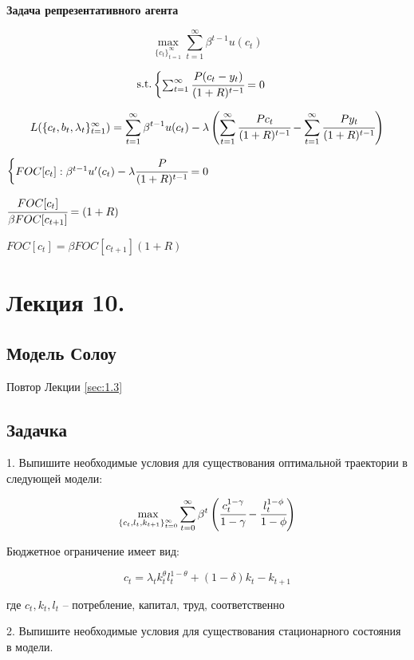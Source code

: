 \documentclass[reqno]{article}
\theoremstyle{definition}
\theoremstyle{definition}
\theoremstyle{definition}
\theoremstyle{definition}
\theoremstyle{definition}
\theoremstyle{definition}
\theoremstyle{definition}
\theoremstyle{definition}
\theoremstyle{definition}
\begin{document}
			 \textbf{Задача репрезентативного агента} 
			
			$$\max\limits_{\{c_t\}_{t=1}^\infty} \sum\limits_{t=1}^\infty \beta^{t-1} u(c_t)$$
			
			$$
			\text{s.t.}
			\begin{cases}
				\sum_{t=1}^\infty \cfrac{P (c_t - y_t)}{(1+R)^{t-1}} = 0
			\end{cases}
			$$
			
			$$L(\{c_t, b_t, \lambda_t\}_{t=1}^\infty) = \sum\limits_{t=1}^\infty \beta^{t-1} u(c_t) - \lambda \left(\sum_{t=1}^\infty \cfrac{P c_t}{(1+R)^{t-1}} - \sum_{t=1}^\infty \cfrac{P y_t}{(1+R)^{t-1}} \right)$$
			
			$
			\begin{cases}
				FOC[c_t]: \beta^{t-1} u'(c_t) - \lambda \cfrac{P}{(1+R)^{t-1}} =0 \\ 
			\end{cases}
			$
			
			$\cfrac{FOC[c_t]}{\beta FOC[c_{t+1}]} = (1+R)$
			
			$FOC[c_t] = \beta FOC[c_{t+1}](1+R)$
			
	\newpage
	
	\section{Лекция 10.}
	
	\subsection{Модель Солоу}
		Повтор Лекции \ref{sec:1.3}
		
	\subsection{Задачка}
	
	1. Выпишите необходимые условия для существования оптимальной траектории в следующей модели:
	
	$$\max\limits_{\{c_t,l_t,k_{t+1}\}_{t=0}^\infty} \sum_{t=0}^\infty \beta^t \left(\cfrac{c_t^{1-\gamma}}{1-\gamma} - \cfrac{l_t^{1-\phi}}{1-\phi}\right)$$
	
	Бюджетное ограничение имеет вид:
	
	$$c_t = \lambda_t k_t^\theta l_t^{1-\theta} + (1-\delta)k_t - k_{t+1}$$
	
	где $c_t, k_t, l_t$ -- потребление, капитал, труд, соответственно 
	
	2. Выпишите необходимые условия для существования стационарного состояния в модели.
	
\end{document}

